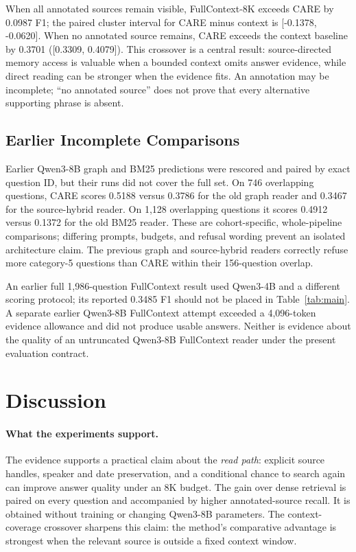 \documentclass[11pt]{article}
\newcommand{\care}{\textsc{CARE}}
\begin{document}
When all annotated sources remain visible, FullContext-8K exceeds \care{}
by 0.0987 F1; the paired cluster interval for \care{} minus context is
[-0.1378, -0.0620]. When no annotated source remains, \care{} exceeds the
context baseline by 0.3701 ([0.3309, 0.4079]). This crossover is a central
result: source-directed memory access is valuable when a bounded context
omits answer evidence, while direct reading can be stronger when the
evidence fits. An annotation may be incomplete; ``no annotated source''
does not prove that every alternative supporting phrase is absent.

\subsection{Earlier Incomplete Comparisons}

Earlier Qwen3-8B graph and BM25 predictions were rescored and paired by
exact question ID, but their runs did not cover the full set. On 746
overlapping questions, \care{} scores 0.5188 versus 0.3786 for the old graph
reader and 0.3467 for the source-hybrid reader. On 1,128 overlapping
questions it scores 0.4912 versus 0.1372 for the old BM25 reader.
These are cohort-specific, whole-pipeline comparisons; differing prompts,
budgets, and refusal wording prevent an isolated architecture claim.
The previous graph and source-hybrid readers correctly refuse more
category-5 questions than \care{} within their 156-question overlap.

An earlier full 1,986-question FullContext result used Qwen3-4B and a
different scoring protocol; its reported 0.3485 F1 should not be placed in
Table~\ref{tab:main}. A separate earlier Qwen3-8B FullContext attempt
exceeded a 4,096-token evidence allowance and did not produce usable
answers. Neither is evidence about the quality of an untruncated
Qwen3-8B FullContext reader under the present evaluation contract.

\section{Discussion}
\label{sec:discussion}

\paragraph{What the experiments support.}
The evidence supports a practical claim about the \emph{read path}:
explicit source handles, speaker and date preservation, and a conditional
chance to search again can improve answer quality under an 8K budget.
The gain over dense retrieval is paired on every question and accompanied
by higher annotated-source recall. It is obtained without training or
changing Qwen3-8B parameters. The context-coverage crossover sharpens this
claim: the method's comparative advantage is strongest when the relevant
source is outside a fixed context window.
\end{document}
